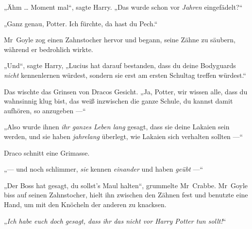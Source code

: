 „Ähm … Moment mal“, sagte Harry.
„Das wurde schon vor \emph{Jahren} eingefädelt?“

„Ganz genau, Potter. Ich fürchte, da hast du Pech.“

Mr~Goyle zog einen Zahnstocher hervor und begann, seine Zähne zu säubern, während er bedrohlich wirkte.

„Und“, sagte Harry,
„Lucius hat darauf bestanden, dass du deine Bodyguards \emph{nicht} kennenlernen würdest, sondern sie erst am ersten Schultag treffen würdest.“

Das wischte das Grinsen von Dracos Gesicht.
„Ja, Potter, wir wissen alle, dass du wahnsinnig klug bist, das weiß inzwischen die ganze Schule, du kannst damit aufhören, so anzugeben —“

„Also wurde ihnen \emph{ihr ganzes Leben lang} gesagt, dass sie deine Lakaien sein werden, und sie haben \emph{jahrelang} überlegt, wie Lakaien sich verhalten sollten —“

Draco schnitt eine Grimasse.

„— und noch schlimmer, \emph{sie} kennen \emph{einander} und haben \emph{geübt} —“

„Der Boss hat gesagt, du sollst’s Maul halten“, grummelte Mr~Crabbe. Mr~Goyle biss auf seinen Zahnstocher, hielt ihn zwischen den Zähnen fest und benutzte eine Hand, um mit den Knöcheln der anderen zu knacksen.

„\emph{Ich habe euch doch gesagt, dass ihr das nicht vor Harry Potter tun sollt!}“



